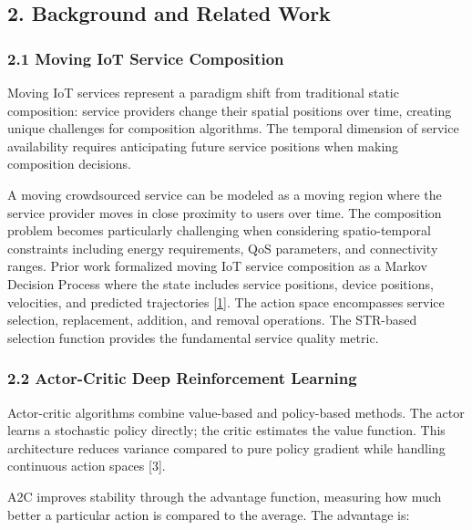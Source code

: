 \subsection{2. Background and Related Work}\label{background-and-related-work}

\hypertarget{moving-iot-service-composition}{%
	\subsubsection{2.1 Moving IoT Service
		Composition}\label{moving-iot-service-composition}}

Moving IoT services represent a paradigm shift from traditional static
composition: service providers change their spatial positions over time,
creating unique challenges for composition algorithms. The temporal
dimension of service availability requires anticipating future service
positions when making composition decisions.

A moving crowdsourced service can be modeled as a moving region where
the service provider moves in close proximity to users over time. The
composition problem becomes particularly challenging when considering
spatio-temporal constraints including energy requirements, QoS
parameters, and connectivity ranges. Prior work formalized moving IoT
service composition as a Markov Decision Process where the state
includes service positions, device positions, velocities, and predicted
trajectories \hyperlink{cite.neiat2021}{\hyperlink{cite.neiat2021}{[1]}}. The action space encompasses service selection,
replacement, addition, and removal operations. The STR-based selection
function provides the fundamental service quality metric.

\hypertarget{actor-critic-deep-reinforcement-learning}{%
	\subsubsection{2.2 Actor-Critic Deep Reinforcement
		Learning}\label{actor-critic-deep-reinforcement-learning}}

Actor-critic algorithms combine value-based and policy-based methods.
The actor learns a stochastic policy directly; the critic estimates the
value function. This architecture reduces variance compared to pure
policy gradient while handling continuous action spaces {[}3{]}.

A2C improves stability through the advantage function, measuring how
much better a particular action is compared to the average. The
advantage is:

